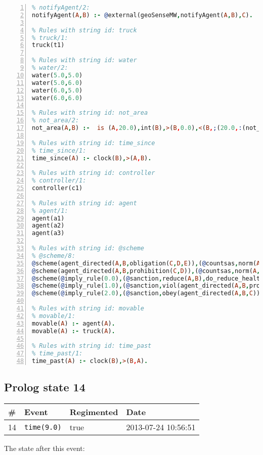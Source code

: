 \documentclass[11pt]{article}\usepackage[utf8]{inputenc}\usepackage{geometry}
\begin{document}
\begin{lstlisting}[language=Prolog, numbers=left]
% Rules with string id: notifyAgent
% notifyAgent/2:
notifyAgent(A,B) :- @external(geoSenseMW,notifyAgent(A,B),C).

% Rules with string id: truck
% truck/1:
truck(t1)

% Rules with string id: water
% water/2:
water(5.0,5.0)
water(5.0,6.0)
water(6.0,5.0)
water(6.0,6.0)

% Rules with string id: not_area
% not_area/2:
not_area(A,B) :-  is (A,20.0),int(B),>(B,0.0),<(B,;(20.0,:(not_area(A,B), is (-(B),20.0)))),int(A),>(A,0.0),<(A,;(20.0,:(area(A,B),-(int(A))))),int(B),>(A,0.0),>(B,0.0),<(A,21.0),<(B,21.0).

% Rules with string id: time_since
% time_since/1:
time_since(A) :- clock(B),>(A,B).

% Rules with string id: controller
% controller/1:
controller(c1)

% Rules with string id: agent
% agent/1:
agent(a1)
agent(a2)
agent(a3)

% Rules with string id: @scheme
% @scheme/8:
@scheme(agent_directed(A,B,obligation(C,D,E)),(@countsas,norm(A,B,F,obligation(C,D,E)),F),false,(listTrue(C)),(time_past(D)),false,[plus(viol(agent_directed(A,B,obligation(C,D,E))))|[]],[plus(obey(agent_directed(A,B,obligation(C,D,E))))|[]])
@scheme(agent_directed(A,B,prohibition(C,D)),(@countsas,norm(A,B,E,prohibition(C,D)),E),(listTrue(C)),false,(false),false,[plus(viol(agent_directed(A,B,prohibition(C,D))))|[]],[plus(obey(agent_directed(A,B,prohibition(C,D))))|[]])
@scheme(@imply_rule(0.0),(@sanction,reduce(A,B),do_reduce_health(A,B),notifyAgent(A,changed(status))),true,false,false,false,[min(reduce(A,B))|[]],[])
@scheme(@imply_rule(1.0),(@sanction,viol(agent_directed(A,B,prohibition(C,D))),do_sanction(D)),true,false,false,false,[min(viol(agent_directed(A,B,prohibition(C,D))))|[]],[])
@scheme(@imply_rule(2.0),(@sanction,obey(agent_directed(A,B,C))),true,false,false,false,[min(obey(agent_directed(A,B,C)))|[]],[])

% Rules with string id: movable
% movable/1:
movable(A) :- agent(A).
movable(A) :- truck(A).

% Rules with string id: time_past
% time_past/1:
time_past(A) :- clock(B),>(B,A).

\end{lstlisting}
\clearpage 
\subsection{Prolog state 14}
\begin{table}[ht]
\centering 
\begin{tabular}{l l l l} 
\textbf{\#} & \textbf{Event} & \textbf{Regimented} & \textbf{Date} \\ [0.5ex] 
\hline
14&\texttt{time(9.0)}&true&2013-07-24 10:56:51\\ [1ex] \hline\end{tabular}
\end{table}
The state after this event:
\end{document}
